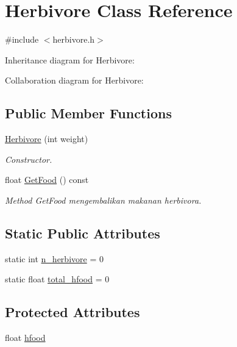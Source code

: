 \hypertarget{classHerbivore}{}\section{Herbivore Class Reference}
\label{classHerbivore}


{\ttfamily \#include $<$herbivore.\+h$>$}



Inheritance diagram for Herbivore\+:


Collaboration diagram for Herbivore\+:
\subsection*{Public Member Functions}
\begin{DoxyCompactItemize}
\item 
\hyperlink{classHerbivore_a15f9af57f1d5d7eabb70fcc1619f1769}{Herbivore} (int weight)
\begin{DoxyCompactList}\small\item\em Constructor. \end{DoxyCompactList}\item 
float \hyperlink{classHerbivore_a2c63fd82a3919c52ca2d34c94d204ca4}{Get\+Food} () const \hypertarget{classHerbivore_a2c63fd82a3919c52ca2d34c94d204ca4}{}\label{classHerbivore_a2c63fd82a3919c52ca2d34c94d204ca4}

\begin{DoxyCompactList}\small\item\em Method Get\+Food mengembalikan makanan herbivora. \end{DoxyCompactList}\end{DoxyCompactItemize}
\subsection*{Static Public Attributes}
\begin{DoxyCompactItemize}
\item 
static int \hyperlink{classHerbivore_ad2c3c8409cb2b0c9f5fa1de7b9fd8430}{n\+\_\+herbivore} = 0
\item 
static float \hyperlink{classHerbivore_a8bd02e6119cd6950a37a8ef3e262fa0a}{total\+\_\+hfood} = 0
\end{DoxyCompactItemize}
\subsection*{Protected Attributes}
\begin{DoxyCompactItemize}
\item 
float \hyperlink{classHerbivore_a86962d379bc0fcc9b8921d8c39b333a7}{hfood}
\end{DoxyCompactItemize}


